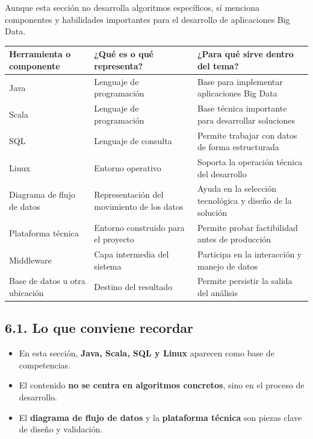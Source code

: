\documentclass[8pt,a4paper,twocolumn]{article}
\begin{document}
Aunque esta sección no desarrolla algoritmos específicos, sí menciona componentes y habilidades importantes para el desarrollo de aplicaciones Big Data.

\begin{table}[t]
\small
\centering
\begin{tabularx}{\textwidth}{>{\raggedright\arraybackslash}p{} >{\raggedright\arraybackslash}p{} >{\raggedright\arraybackslash}X}
\toprule
\textbf{Herramienta o componente} & \textbf{¿Qué es o qué representa?} & \textbf{¿Para qué sirve dentro del tema?} \\
\midrule
Java & Lenguaje de programación & Base para implementar aplicaciones Big Data \\
Scala & Lenguaje de programación & Base técnica importante para desarrollar soluciones \\
SQL & Lenguaje de consulta & Permite trabajar con datos de forma estructurada \\
Linux & Entorno operativo & Soporta la operación técnica del desarrollo \\
Diagrama de flujo de datos & Representación del movimiento de los datos & Ayuda en la selección tecnológica y diseño de la solución \\
Plataforma técnica & Entorno construido para el proyecto & Permite probar factibilidad antes de producción \\
Middleware & Capa intermedia del sistema & Participa en la interacción y manejo de datos \\
Base de datos u otra ubicación & Destino del resultado & Permite persistir la salida del análisis \\
\bottomrule
\end{tabularx}
\end{table}

\subsection*{6.1. Lo que conviene recordar}

\begin{itemize}[leftmargin=*]
    \item En esta sección, \textbf{Java, Scala, SQL y Linux} aparecen como base de competencias.
    \item El contenido \textbf{no se centra en algoritmos concretos}, sino en el proceso de desarrollo.
    \item El \textbf{diagrama de flujo de datos} y la \textbf{plataforma técnica} son piezas clave de diseño y validación.
\end{itemize}
\end{document}
